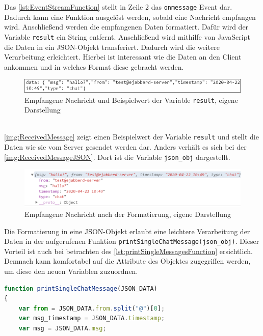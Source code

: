 \documentclass[a4paper,titlepage,halfparskip,12pt]{scrreprt}
\begin{document}
\begin{onehalfspacing}
Das \autoref{lst:EventStreamFunction} stellt in Zeile 2 das \texttt{onmessage} Event dar. Dadurch kann eine Funktion ausgelöst werden, sobald eine Nachricht empfangen wird. Anschließend werden die empfangenen Daten formatiert. Dafür wird der Variable \texttt{result} ein String entfernt. Anschließend wird mithilfe von JavaScript die Daten in ein JSON-Objekt transferiert. Dadurch wird die weitere Verarbeitung erleichtert. Hierbei ist interessant wie die Daten an den Client ankommen und in welches Format diese gebracht werden.
\begin{figure}[h]
	\centering
	\includegraphics[scale=1.2]{images/GochatAusgabeEmpfangenerNachrichtBearbeitet}
	\caption{Empfangene Nachricht und Beispielwert der Variable \texttt{result}, eigene Darstellung}
	\label{img:ReceivedMessage}
\end{figure}\\
\autoref{img:ReceivedMessage} zeigt einen Beispielwert der Variable \texttt{result} und stellt die Daten wie sie vom Server gesendet werden dar. Anders verhält es sich bei der \autoref{img:ReceivedMessageJSON}. Dort ist die Variable \texttt{json\_obj} dargestellt.
\begin{figure}[h]
	\centering
	\includegraphics[width=\textwidth]{images/GochatAusgabeEmpfangenerNachrichtJSONformat}
	\caption{Empfangene Nachricht nach der Formatierung, eigene Darstellung}
	\label{img:ReceivedMessageJSON}
\end{figure}
Die Formatierung in eine JSON-Objekt erlaubt eine leichtere Verarbeitung der Daten in der aufgerufenen Funktion \texttt{printSingleChatMessage(json\_obj)}. 
Dieser Vorteil ist auch bei betrachten des \autoref{lst:printSingleMessagesFunction} ersichtlich. Demnach kann komfortabel auf die Attribute des Objektes zugegriffen werden, um diese den neuen Variablen zuzuordnen. 
\begin{lstlisting}[language=Javascript,caption=Funktion und Datenverarbeitung des JSON-Objektes ,label={lst:printSingleMessagesFunction}]
function printSingleChatMessage(JSON_DATA)
{
	var from = JSON_DATA.from.split("@")[0];
	var msg_timestamp = JSON_DATA.timestamp;
	var msg = JSON_DATA.msg;

\end{lstlisting}
\end{onehalfspacing}
\end{document}
